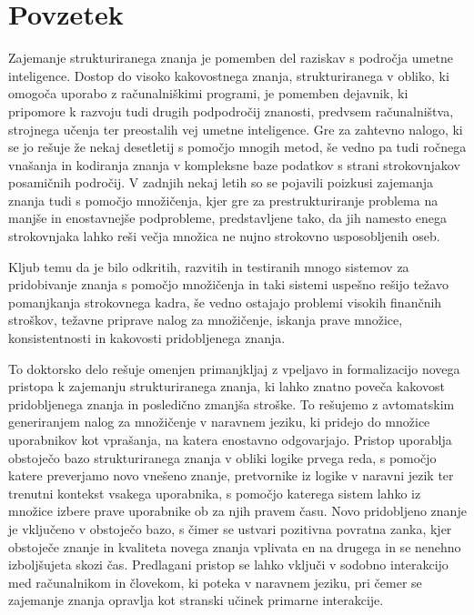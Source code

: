 % 
\chapter*{Povzetek}

Zajemanje strukturiranega znanja je pomemben del raziskav s področja umetne
inteligence. Dostop do visoko kakovostnega znanja, strukturiranega v obliko, ki omogoča uporabo z računalniškimi programi, je pomemben dejavnik, ki pripomore k razvoju tudi drugih podpodročij znanosti, predvsem računalništva, strojnega učenja ter preostalih vej umetne inteligence. Gre za zahtevno nalogo, ki se jo
rešuje že nekaj desetletij s pomočjo mnogih metod, še vedno pa tudi ročnega vnašanja in kodiranja znanja v kompleksne baze podatkov s strani strokovnjakov
posamičnih področij. V zadnjih nekaj letih so se pojavili poizkusi zajemanja
znanja tudi s pomočjo množičenja, kjer gre za prestrukturiranje problema na
manjše in enostavnejše podprobleme, predstavljene tako, da jih namesto enega strokovnjaka lahko reši večja množica ne nujno strokovno usposobljenih oseb.

Kljub temu da je bilo odkritih, razvitih in testiranih mnogo sistemov za pridobivanje znanja s pomočjo množičenja in taki sistemi uspešno rešijo težavo pomanjkanja strokovnega kadra, še vedno ostajajo problemi visokih finančnih stroškov, težavne priprave nalog za množičenje, iskanja prave množice, konsistentnosti in kakovosti pridobljenega znanja.

To doktorsko delo rešuje omenjen primanjkljaj z vpeljavo in formalizacijo novega pristopa k zajemanju strukturiranega znanja, ki lahko znatno poveča kakovost pridobljenega znanja in posledično zmanjša stroške. To rešujemo z
avtomatskim generiranjem nalog za množičenje v naravnem jeziku, ki pridejo do množice uporabnikov kot vprašanja, na katera enostavno odgovarjajo. Pristop
uporablja obstoječo bazo strukturiranega znanja v obliki logike prvega reda, s
pomočjo katere preverjamo novo vnešeno znanje, pretvornike iz logike v naravni jezik ter trenutni kontekst vsakega uporabnika, s pomočjo katerega sistem lahko
iz množice izbere prave uporabnike ob za njih pravem času. Novo pridobljeno znanje je vključeno v obstoječo bazo, s čimer se ustvari pozitivna povratna zanka, kjer obstoječe znanje in kvaliteta novega znanja vplivata en na drugega in se nenehno izboljšujeta skozi čas. Predlagani pristop se lahko vključi v sodobno interakcijo med računalnikom in človekom, ki poteka v naravnem jeziku,
pri čemer se zajemanje znanja opravlja kot stranski učinek primarne interakcije.

